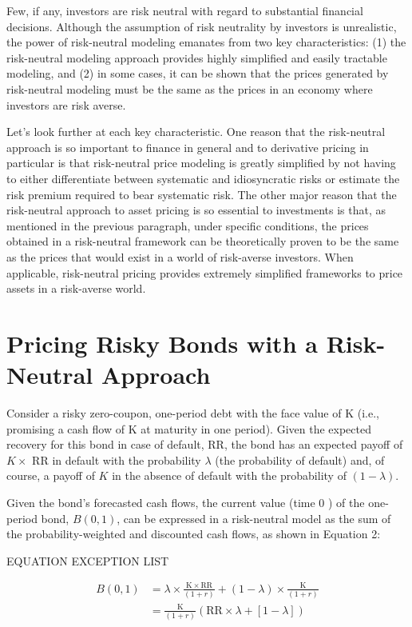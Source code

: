\documentclass[11pt]{article}
\begin{document}
Few, if any, investors are risk neutral with regard to substantial financial decisions. Although the assumption of risk neutrality by investors is unrealistic, the power of risk-neutral modeling emanates from two key characteristics: (1) the risk-neutral modeling approach provides highly simplified and easily tractable modeling, and (2) in some cases, it can be shown that the prices generated by risk-neutral modeling must be the same as the prices in an economy where investors are risk averse.

Let's look further at each key characteristic. One reason that the risk-neutral approach is so important to finance in general and to derivative pricing in particular is that risk-neutral price modeling is greatly simplified by not having to either differentiate between systematic and idiosyncratic risks or estimate the risk premium required to bear systematic risk. The other major reason that the risk-neutral approach to asset pricing is so essential to investments is that, as mentioned in the previous paragraph, under specific conditions, the prices obtained in a risk-neutral framework can be theoretically proven to be the same as the prices that would exist in a world of risk-averse investors. When applicable, risk-neutral pricing provides extremely simplified frameworks to price assets in a risk-averse world.

\section*{Pricing Risky Bonds with a Risk-Neutral Approach}
Consider a risky zero-coupon, one-period debt with the face value of $\mathrm{K}$ (i.e., promising a cash flow of $\mathrm{K}$ at maturity in one period). Given the expected recovery for this bond in case of default, RR, the bond has an expected payoff of $K \times$ RR in default with the probability $\lambda$ (the probability of default) and, of course, a payoff of $K$ in the absence of default with the probability of $(1-\lambda)$.

Given the bond's forecasted cash flows, the current value (time 0 ) of the one-period bond, $B(0,1)$, can be expressed in a risk-neutral model as the sum of the probability-weighted and discounted cash flows, as shown in Equation 2:

EQUATION EXCEPTION LIST

$$
\begin{aligned}
B(0,1) & =\lambda \times \frac{\mathrm{K} \times \mathrm{RR}}{(1+r)}+(1-\lambda) \times \frac{\mathrm{K}}{(1+r)} \\
& =\frac{\mathrm{K}}{(1+r)}(\mathrm{RR} \times \lambda+[1-\lambda])
\end{aligned}
$$
\end{document}
